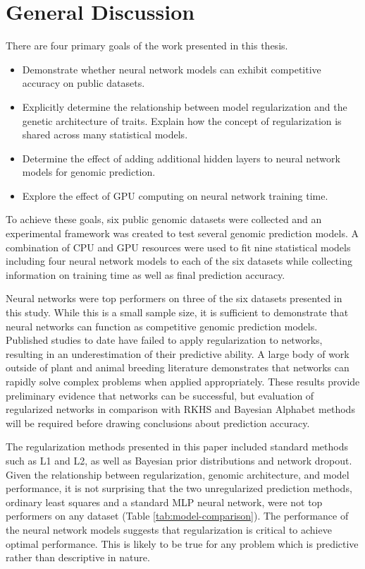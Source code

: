\section{General Discussion}

There are four primary goals of the work presented in this thesis.

\begin{itemize}
    \item Demonstrate whether neural network models can exhibit competitive 
          accuracy on public datasets.
    \item Explicitly determine the relationship between model regularization and 
          the genetic architecture of traits. Explain how the concept of 
          regularization is shared across many statistical models.
    \item Determine the effect of adding additional hidden layers to neural 
          network models for genomic prediction.
    \item Explore the effect of GPU computing on neural network training time.
\end{itemize}

To achieve these goals, six public genomic datasets were collected and an
experimental framework was created to test several genomic prediction models.
A combination of CPU and GPU resources were
used to fit nine statistical models including four neural network models
to each of the six datasets while collecting information on training 
time as well as final prediction accuracy. 

Neural networks were top performers on three of the six datasets
presented in this study. While this is a small sample size, it is
sufficient to demonstrate that neural networks can function as 
competitive genomic prediction models. Published studies to date have failed 
to apply regularization to networks, resulting in an underestimation 
of their predictive ability. A large body of work outside of plant 
and animal breeding literature demonstrates that networks can 
rapidly solve complex problems when applied appropriately.
These results provide preliminary evidence that networks can be successful,
but evaluation of regularized networks in comparison with RKHS and 
Bayesian Alphabet methods will be required before drawing conclusions about 
prediction accuracy.

The regularization methods presented in this paper included standard methods such 
as L1 and L2, as well as Bayesian prior distributions and network dropout. 
Given the relationship between regularization, genomic architecture, and model 
performance, it is not surprising that the two unregularized prediction methods, 
ordinary least squares and a standard MLP neural network, were not top performers 
on any dataset (Table \ref{tab:model-comparison}). The performance of the neural 
network models suggests that regularization is critical to achieve optimal 
performance. This is likely to be true for any problem which is predictive rather 
than descriptive in nature.

